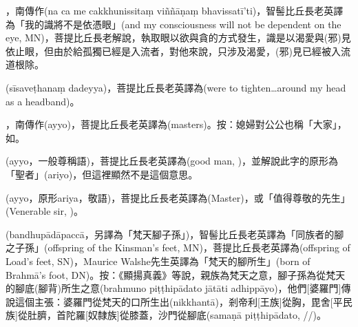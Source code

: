 \startitemgroup[noteitems]
\item{}，南傳作(na ca me cakkhunissitaṃ viññāṇaṃ bhavissatī’ti)，智髻比丘長老英譯為「我的識將不是依憑眼」(and my consciousness will not be dependent on the eye, MN)，菩提比丘長老解說，執取眼以欲與貪的方式發生，識是以渴愛與(邪)見依止眼，但由於給孤獨已經是入流者，對他來說，只涉及渴愛，(邪)見已經被入流道根除。
\stopitemgroup

\startitemgroup[noteitems]
\item{}(sīsaveṭhanaṃ dadeyya)，菩提比丘長老英譯為(were to tighten…around my head as a headband)。
\stopitemgroup

\startitemgroup[noteitems]
\item{}，南傳作(ayyo)，菩提比丘長老英譯為(masters)。按：媳婦對公公也稱「大家」，如。
\item{}(ayyo，一般尊稱語)，菩提比丘長老英譯為(good man, )，並解說此字的原形為「聖者」(ariyo)，但這裡顯然不是這個意思。
\item{}(ayyo，原形ariya，敬語)，菩提比丘長老英譯為(Master)，或「值得尊敬的先生」(Venerable sir, )。
\stopitemgroup

\startitemgroup[noteitems]
\item{}(bandhupādāpaccā，另譯為「梵天腳子孫」)，智髻比丘長老英譯為「同族者的腳之子孫」(offspring of the Kinsman's feet, MN)，菩提比丘長老英譯為(offspring of Load’s feet, SN)，Maurice Walshe先生英譯為「梵天的腳所生」(born of Brahmā's foot, DN)。按：《顯揚真義》等說，親族為梵天之意，腳子孫為從梵天的腳底(腳背)所生之意(brahmuno piṭṭhipādato jātāti adhippāyo)，他們[婆羅門]傳說這個主張：婆羅門從梵天的口所生出(nikkhantā)，剎帝利[王族]從胸，毘舍[平民族]從肚臍，首陀羅[奴隸族]從膝蓋，沙門從腳底(samaṇā piṭṭhipādato, //)。
\stopitemgroup

